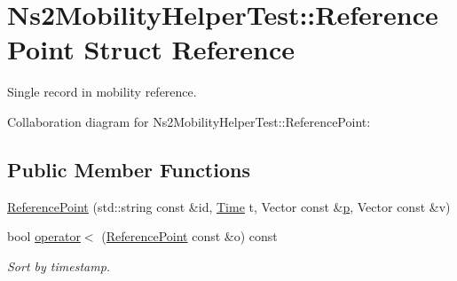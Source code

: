 \hypertarget{structNs2MobilityHelperTest_1_1ReferencePoint}{}\section{Ns2\+Mobility\+Helper\+Test\+:\+:Reference\+Point Struct Reference}
\label{structNs2MobilityHelperTest_1_1ReferencePoint}


Single record in mobility reference.  




Collaboration diagram for Ns2\+Mobility\+Helper\+Test\+:\+:Reference\+Point\+:
\subsection*{Public Member Functions}
\begin{DoxyCompactItemize}
\item 
\hyperlink{structNs2MobilityHelperTest_1_1ReferencePoint_a97b7b6d5817128cade71dc3e0d05df1d}{Reference\+Point} (std\+::string const \&id, \hyperlink{classns3_1_1Time}{Time} t, Vector const \&\hyperlink{lte__link__budget__x2__handover__measures_8m_ac9de518908a968428863f829398a4e62}{p}, Vector const \&v)
\item 
bool \hyperlink{structNs2MobilityHelperTest_1_1ReferencePoint_a903f3b46449c150450611479fedde48d}{operator$<$} (\hyperlink{structNs2MobilityHelperTest_1_1ReferencePoint}{Reference\+Point} const \&o) const 
\begin{DoxyCompactList}\small\item\em Sort by timestamp. \end{DoxyCompactList}\end{DoxyCompactItemize}
